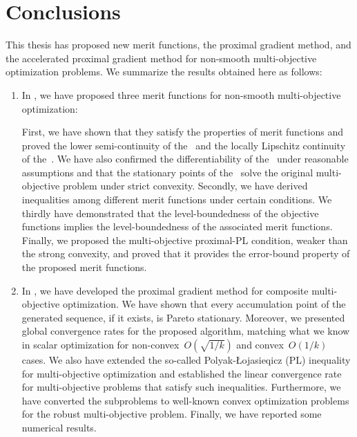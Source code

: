 \documentclass[../main]{subfiles}
\begin{document}
\chapter{Conclusions} 
This thesis has proposed new merit functions, the proximal gradient method, and the accelerated proximal gradient method for non-smooth multi-objective optimization problems.
We summarize the results obtained here as follows:
\begin{enumerate}
    \item In , we have proposed three merit functions for non-smooth multi-objective optimization:
        First, we have shown that they satisfy the properties of merit functions and proved the lower semi-continuity of the~ and the locally Lipschitz continuity of the~.
        We have also confirmed the differentiability of the~ under reasonable assumptions and that the stationary points of the~ solve the original multi-objective problem under strict convexity.
        Secondly, we have derived inequalities among different merit functions under certain conditions.
        We thirdly have demonstrated that the level-boundedness of the objective functions implies the level-boundedness of the associated merit functions.
        Finally, we proposed the multi-objective proximal-PL condition, weaker than the strong convexity, and proved that it provides the error-bound property of the proposed merit functions.

    \item In , we have developed the proximal gradient method for composite multi-objective optimization.
        We have shown that every accumulation point of the generated sequence, if it exists, is Pareto stationary.
        Moreover, we presented global convergence rates for the proposed algorithm, matching what we know in scalar optimization for non-convex~$O(\sqrt{1 / k})$ and convex~$O(1 / k)$ cases.
        We also have extended the so-called Polyak-{\L}ojasieqicz (PL) inequality for multi-objective optimization and established the linear convergence rate for multi-objective problems that satisfy such inequalities.
        Furthermore, we have converted the subproblems to well-known convex optimization problems for the robust multi-objective problem.
        Finally, we have reported some numerical results.


\end{enumerate}
\end{document}
